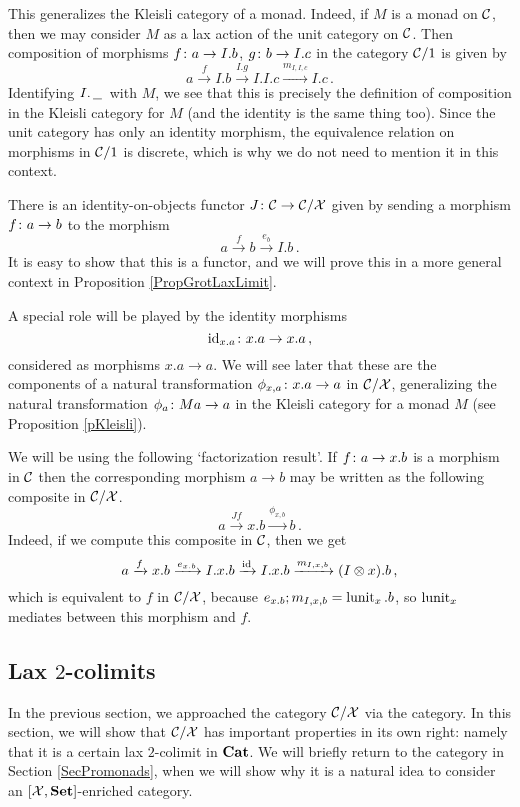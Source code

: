 \documentclass{article}
\begin{document}
\begin{remark}
  This generalizes the Kleisli category of a monad.  
  Indeed, if $M$ is a monad on ${\mathcal{C}}$, then we may consider $M$ as a lax action of the unit category on ${\mathcal{C}}$.
  Then composition of morphisms $f \colon a \to I.b$, $g \colon b \to I.c$ in the category ${\mathcal{C}}/1$ is given by
  \[
    a \xrightarrow{f}
    I.b \xrightarrow{I.g}
    I.I.c \xrightarrow{m_{I,I,c}}
    I.c\,.
    \]
  Identifying $I.\,\underline{\hspace{1.5ex}}\,$ with $M$, we see that this is precisely the definition of composition in the Kleisli category for $M$ (and the identity is the same thing too).  
  Since the unit category has only an identity morphism, the equivalence relation on morphisms in ${\mathcal{C}}/1$ is discrete, which is why we do not need to mention it in this context.
\end{remark}

There is an identity-on-objects functor $J \colon {\mathcal{C}} \to {\mathcal{C}}/\mathcal X$ given by sending a morphism $f \colon a \to b$ to the \Mellies morphism
\[
  a \xrightarrow{f}
  b \xrightarrow{e_b}
  I.b\,.
  \]
It is easy to show that this is a functor, and we will prove this in a more general context in Proposition \ref{PropGrotLaxLimit}.

A special role will be played by the identity morphisms
\[
  \operatorname{id}_{x.a} \colon x.a \to x.a\,,
  \]
considered as \Mellies morphisms $x.a \to a$.  
We will see later that these are the components of a natural transformation $\phi_{x,a}\colon x.a \to a$ in ${\mathcal{C}}/\mathcal X$, generalizing the natural transformation $\phi_a \colon Ma \to a$ in the Kleisli category for a monad $M$ (see Proposition \ref{pKleisli}).

We will be using the following `factorization result'.  
If $f \colon a \to x.b$ is a morphism in ${\mathcal{C}}$ then the corresponding \Mellies morphism $a \to b$ may be written as the following composite in ${\mathcal{C}}/\mathcal X$.
\[
  a \xrightarrow{Jf}
  x.b \xrightarrow{\phi_{x,b}}
  b\,.
  \]
Indeed, if we compute this composite in ${\mathcal{C}}$, then we get
\[
  a \xrightarrow{f}
  x.b \xrightarrow{e_{x.b}}
  I.x.b \xrightarrow{\operatorname{id}}
  I.x.b \xrightarrow{m_{I,x,b}}
  (I\otimes x).b\,,
  \]
which is equivalent to $f$ in ${\mathcal{C}}/\mathcal X$, because $e_{x.b};m_{I,x,b}=\operatorname{lunit}_x.b$, so $\operatorname{lunit}_x$ mediates between this morphism and $f$.

\subsection{Lax $2$-colimits}

In the previous section, we approached the category ${\mathcal{C}}/\mathcal X$ via the \Mellies category.  
In this section, we will show that ${\mathcal{C}}/\mathcal X$ has important properties in its own right: namely that it is a certain lax $2$-colimit in ${\normalfont\textbf{Cat}}$.  
We will briefly return to the \Mellies category in Section \ref{SecPromonads}, when we will show why it is a natural idea to consider an $[\mathcal X,{\normalfont\textbf{Set}}]$-enriched category.
\end{document}
